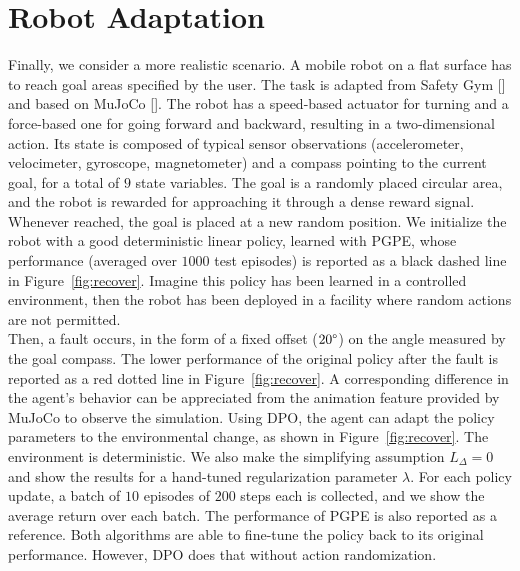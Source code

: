 \section{Robot Adaptation} \label{sec:safe}
Finally, we consider a more realistic scenario. A mobile robot on a flat surface has to reach goal areas specified by the user. 
The task is adapted from Safety Gym [\cite{ray2019benchmarking}] and based on MuJoCo [\cite{todorov2012mujoco}]. The robot has a speed-based actuator for turning and a force-based one for going forward and backward, resulting in a two-dimensional action. Its state is composed of typical sensor observations (accelerometer, velocimeter, gyroscope, magnetometer) and a compass pointing to the current goal, for a total of $9$ state variables. The goal is a randomly placed circular area, and the robot is rewarded for approaching it through a dense reward signal. Whenever reached, the goal is placed at a new random position. We initialize the robot with a good deterministic linear policy, learned with \ac{PGPE}, whose performance (averaged over $1000$ test episodes) is reported as a black dashed line in Figure~\ref{fig:recover}. Imagine this policy has been learned in a controlled environment, then the robot has been deployed in a facility where random actions are not permitted.\\
\newline
Then, a fault occurs, in the form of a fixed offset ($20\degree$) on the angle measured by the goal compass. The lower performance of the original policy after the fault is reported as a red dotted line in Figure~\ref{fig:recover}. A corresponding difference in the agent's behavior can be appreciated from the animation feature provided by MuJoCo to observe the simulation. Using \ac{DPO}, the agent can adapt the policy parameters to the environmental change, as shown in Figure~\ref{fig:recover}. The environment is deterministic. We also make the simplifying assumption $L_{\Delta}=0$ and show the results for a hand-tuned regularization parameter $\lambda$. For each policy update, a batch of $10$ episodes of $200$ steps each is collected, and we show the average return over each batch. The performance of \ac{PGPE} is also reported as a reference. Both algorithms are able to fine-tune the policy back to its original performance. However, \ac{DPO} does that without action randomization.
